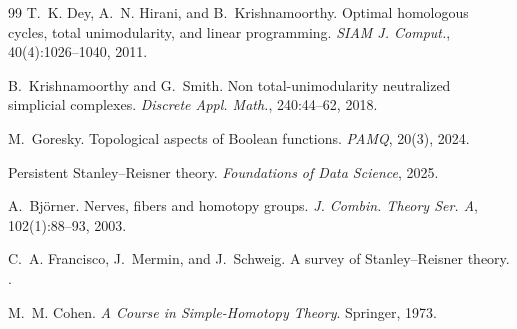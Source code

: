 \documentclass[11pt]{article}
\begin{document}
\begin{thebibliography}{99}
T.~K. Dey, A.~N. Hirani, and B.~Krishnamoorthy.
\newblock Optimal homologous cycles, total unimodularity, and linear programming.
\newblock \emph{SIAM J. Comput.}, 40(4):1026--1040, 2011.

B.~Krishnamoorthy and G.~Smith.
\newblock Non total-unimodularity neutralized simplicial complexes.
\newblock \emph{Discrete Appl. Math.}, 240:44--62, 2018.

M.~Goresky.
\newblock Topological aspects of Boolean functions.
\newblock \emph{PAMQ}, 20(3), 2024.

Persistent Stanley--Reisner theory.
\newblock \emph{Foundations of Data Science}, 2025.

A.~Bj\"orner.
\newblock Nerves, fibers and homotopy groups.
\newblock \emph{J. Combin. Theory Ser. A}, 102(1):88--93, 2003.

C.~A. Francisco, J.~Mermin, and J.~Schweig.
\newblock A survey of Stanley--Reisner theory.
.

M.~M. Cohen.
\newblock \emph{A Course in Simple-Homotopy Theory}.
\newblock Springer, 1973.

\end{thebibliography}
\end{document}
